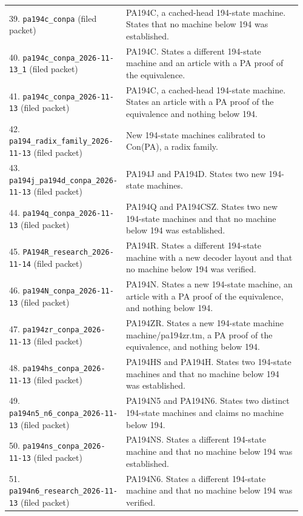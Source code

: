 \begin{longtable}{@{}p{0.35\linewidth}p{0.61\linewidth}@{}}
39. \nolinkurl{pa194c_conpa} (filed packet) & PA194C, a cached-head 194-state machine. States that no machine below 194 was established.\\[5pt]
40. \nolinkurl{pa194c_conpa_2026-11-13_1} (filed packet) & PA194C. States a different 194-state machine and an article with a PA proof of the equivalence.\\[5pt]
41. \nolinkurl{pa194c_conpa_2026-11-13} (filed packet) & PA194C, a cached-head 194-state machine. States an article with a PA proof of the equivalence and nothing below 194.\\[5pt]
42. \nolinkurl{pa194_radix_family_2026-11-13} (filed packet) & New 194-state machines calibrated to Con(PA), a radix family.\\[5pt]
43. \nolinkurl{pa194j_pa194d_conpa_2026-11-13} (filed packet) & PA194J and PA194D. States two new 194-state machines.\\[5pt]
44. \nolinkurl{pa194q_conpa_2026-11-13} (filed packet) & PA194Q and PA194CSZ. States two new 194-state machines and that no machine below 194 was established.\\[5pt]
45. \nolinkurl{PA194R_research_2026-11-14} (filed packet) & PA194R. States a different 194-state machine with a new decoder layout and that no machine below 194 was verified.\\[5pt]
46. \nolinkurl{pa194N_conpa_2026-11-13} (filed packet) & PA194N. States a new 194-state machine, an article with a PA proof of the equivalence, and nothing below 194.\\[5pt]
47. \nolinkurl{pa194zr_conpa_2026-11-13} (filed packet) & PA194ZR. States a new 194-state machine machine/pa194zr.tm, a PA proof of the equivalence, and nothing below 194.\\[5pt]
48. \nolinkurl{pa194hs_conpa_2026-11-13} (filed packet) & PA194HS and PA194H. States two 194-state machines and that no machine below 194 was established.\\[5pt]
49. \nolinkurl{pa194n5_n6_conpa_2026-11-13} (filed packet) & PA194N5 and PA194N6. States two distinct 194-state machines and claims no machine below 194.\\[5pt]
50. \nolinkurl{pa194ns_conpa_2026-11-13} (filed packet) & PA194NS. States a different 194-state machine and that no machine below 194 was established.\\[5pt]
51. \nolinkurl{pa194n6_research_2026-11-13} (filed packet) & PA194N6. States a different 194-state machine and that no machine below 194 was verified.\\[5pt]

\end{longtable}
